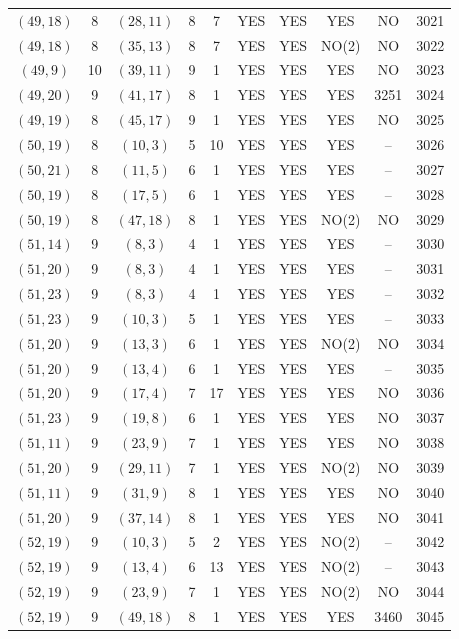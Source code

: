 \begin{longtable}{|c|c|c|c|c|c|c|c|c|c|}
$(49, 18)$ & 8 & $(28, 11)$ & 8 & 7 & YES & YES & YES & NO & 3021\\
$(49, 18)$ & 8 & $(35, 13)$ & 8 & 7 & YES & YES & NO(2) & NO & 3022\\
$(49, 9)$ & 10 & $(39, 11)$ & 9 & 1 & YES & YES & YES & NO & 3023\\
$(49, 20)$ & 9 & $(41, 17)$ & 8 & 1 & YES & YES & YES & 3251 & 3024\\
$(49, 19)$ & 8 & $(45, 17)$ & 9 & 1 & YES & YES & YES & NO & 3025\\
$(50, 19)$ & 8 & $(10, 3)$ & 5 & 10 & YES & YES & YES & -- & 3026\\
$(50, 21)$ & 8 & $(11, 5)$ & 6 & 1 & YES & YES & YES & -- & 3027\\
$(50, 19)$ & 8 & $(17, 5)$ & 6 & 1 & YES & YES & YES & -- & 3028\\
$(50, 19)$ & 8 & $(47, 18)$ & 8 & 1 & YES & YES & NO(2) & NO & 3029\\
$(51, 14)$ & 9 & $(8, 3)$ & 4 & 1 & YES & YES & YES & -- & 3030\\
$(51, 20)$ & 9 & $(8, 3)$ & 4 & 1 & YES & YES & YES & -- & 3031\\
$(51, 23)$ & 9 & $(8, 3)$ & 4 & 1 & YES & YES & YES & -- & 3032\\
$(51, 23)$ & 9 & $(10, 3)$ & 5 & 1 & YES & YES & YES & -- & 3033\\
$(51, 20)$ & 9 & $(13, 3)$ & 6 & 1 & YES & YES & NO(2) & NO & 3034\\
$(51, 20)$ & 9 & $(13, 4)$ & 6 & 1 & YES & YES & YES & -- & 3035\\
$(51, 20)$ & 9 & $(17, 4)$ & 7 & 17 & YES & YES & YES & NO & 3036\\
$(51, 23)$ & 9 & $(19, 8)$ & 6 & 1 & YES & YES & YES & NO & 3037\\
$(51, 11)$ & 9 & $(23, 9)$ & 7 & 1 & YES & YES & YES & NO & 3038\\
$(51, 20)$ & 9 & $(29, 11)$ & 7 & 1 & YES & YES & NO(2) & NO & 3039\\
$(51, 11)$ & 9 & $(31, 9)$ & 8 & 1 & YES & YES & YES & NO & 3040\\
$(51, 20)$ & 9 & $(37, 14)$ & 8 & 1 & YES & YES & YES & NO & 3041\\
$(52, 19)$ & 9 & $(10, 3)$ & 5 & 2 & YES & YES & NO(2) & -- & 3042\\
$(52, 19)$ & 9 & $(13, 4)$ & 6 & 13 & YES & YES & NO(2) & -- & 3043\\
$(52, 19)$ & 9 & $(23, 9)$ & 7 & 1 & YES & YES & NO(2) & NO & 3044\\
$(52, 19)$ & 9 & $(49, 18)$ & 8 & 1 & YES & YES & YES & 3460 & 3045\\

\end{longtable}
